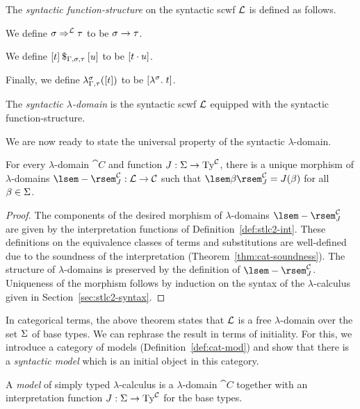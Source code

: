 \begin{defn} \label{def:syn-ldom}
The \emph{syntactic function-structure} on the syntactic scwf $\mathcal{L}$ is defined as follows.
\begin{enum}
\item We define $\Sfuncty{\sigma}{\tau}[\syncat]$ to be $\sigma \to \tau$.
\item We define $\Sapp[\Gamma,\sigma,\tau]{[t]}{[u]}$ to be $[t \cdot u]$.
\item Finally, we define $\Slam{\sigma}[\Gamma,\tau]{[t]}$ to be $[\lambda^{\sigma}.\;t]$.
\end{enum}
The \emph{syntactic $\lambda$-domain} is the syntactic scwf $\mathcal{L}$ equipped with the syntactic function-structure.
\end{defn}

We are now ready to state the universal property of the syntactic $\lambda$-domain.

\begin{thm} \label{thm:syncat-free-ldom}
For every $\lambda$-domain $\cat{C}$ and function $J : \Basetypes \to \STy[\cat{C}]$, there is a unique morphism of $\lambda$-domains $\cint[J]{-}[\cat{C}] : \syncat \to \cat{C}$ such that $\cint[J]{\beta}[\cat{C}] = J(\beta)$ for all $\beta \in \Sigma$.
\begin{proof}
The components of the desired morphism of $\lambda$-domains $\cint[J]{-}[\cat{C}]$ are given by the interpretation functions of Definition~\ref{def:stlc2-int}. These definitions on the equivalence classes of terms and substitutions are well-defined due to the soundness of the interpretation (Theorem~\ref{thm:cat-soundness}). The structure of $\lambda$-domains is preserved by the definition of $\cint[J]{-}[\cat{C}]$. Uniqueness of the morphism follows by induction on the syntax of the $\lambda$-calculus given in Section~\ref{sec:stlc2-syntax}.
\end{proof}
\end{thm}

In categorical terms, the above theorem states that $\mathcal{L}$ is a free $\lambda$-domain over the set $\Sigma$ of base types. We can rephrase the result in terms of initiality. For this, we introduce a category of models (Definition~\ref{def:cat-mod}) and show that there is a \textit{syntactic model} which is an initial object in this category.

\begin{defn}[Model] \label{def:stlc2-mod}
A \emph{model} of simply typed $\lambda$-calculus is a $\lambda$-domain $\cat{C}$ together with an interpretation function $J : \Basetypes \to \STy[\cat{C}]$ for the base types.
\end{defn}

